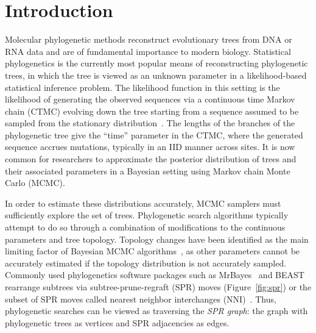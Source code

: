 \documentclass[10pt,twoside,leqno,twocolumn]{article}
\begin{document}
\section{Introduction}
Molecular phylogenetic methods reconstruct evolutionary trees from DNA or RNA data and are of fundamental importance to modern biology.
Statistical phylogenetics is the currently most popular means of reconstructing phylogenetic trees, in which the tree is viewed as an unknown parameter in a likelihood-based statistical inference problem.
The likelihood function in this setting is the likelihood of generating the observed sequences via a continuous time Markov chain (CTMC) evolving down the tree starting from a sequence assumed to be sampled from the stationary distribution~\cite{felsenstein1981evolutionary}.
The lengths of the branches of the phylogenetic tree give the ``time'' parameter in the CTMC, where the generated sequence accrues mutations, typically in an IID manner across sites.
It is now common for researchers to approximate the posterior distribution of trees and their associated parameters in a Bayesian setting using Markov chain Monte Carlo (MCMC).

In order to estimate these distributions accurately, MCMC samplers must sufficiently explore the set of trees.
Phylogenetic search algorithms typically attempt to do so through a combination of modifications to the continuous parameters and tree topology.
Topology changes have been identified as the main limiting factor of Bayesian MCMC algorithms~\cite{lakner2008efficiency,hohna2012guided}, as other parameters cannot be accurately estimated if the topology distribution is not accurately sampled.
Commonly used phylogenetics software packages such as MrBayes~\cite{Ronquist2012-hi} and BEAST~\cite{bouckaert2014beast} rearrange subtrees via subtree-prune-regraft (SPR) moves (Figure~\ref{fig:spr}) or the subset of SPR moves called nearest neighbor interchanges (NNI)~\cite{robinson1971comparison}.
Thus, phylogenetic searches can be viewed as traversing the \emph{SPR graph}: the graph with phylogenetic trees as vertices and SPR adjacencies as edges.
\end{document}
